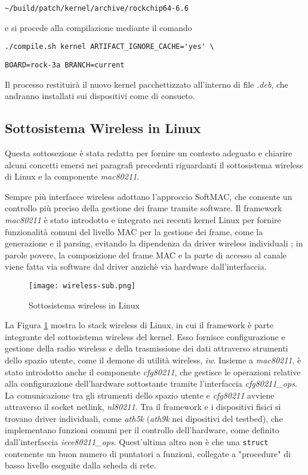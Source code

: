 \verb|~/build/patch/kernel/archive/rockchip64-6.6 |

\noindent e si procede alla compilazione mediante il comando 

\verb|./compile.sh kernel ARTIFACT_IGNORE_CACHE='yes' \| 

\verb|BOARD=rock-3a BRANCH=current|

\noindent Il processo restituirà il nuovo kernel pacchettizzato all'interno di file \textit{.deb}, che andranno installati sui dispositivi come di consueto.

\subsection{Sottosistema Wireless in Linux}
\label{subsystem}
Questa sottosezione è stata redatta per fornire un contesto adeguato e chiarire alcuni concetti emersi nei paragrafi precedenti riguardanti il sottosistema wireless di Linux e la componente \textit{mac80211}.

Sempre più interfacce wireless adottano l'approccio SoftMAC, che consente un controllo più preciso della gestione dei frame tramite software. Il framework \textit{mac80211} è stato introdotto e integrato nei recenti kernel Linux per fornire funzionalità comuni del livello MAC per la gestione dei frame, come la generazione e il parsing, evitando la dipendenza da driver wireless individuali \cite{wireless-profiling}; in parole povere, la composizione del frame MAC e la parte di accesso al canale viene fatta via software dal driver anzichè via hardware dall'interfaccia.

\begin{figure}[h!]
    \centering
    \texttt{[image: wireless-sub.png]}
    \caption{Sottosistema wireless in Linux}
    \label{fig:wireless-sub}
\end{figure}

La Figura \ref{fig:wireless-sub} mostra lo stack wireless di Linux, in cui il framework è parte integrante del sottosistema wireless del kernel. Esso fornisce configurazione e gestione della radio wireless e della trasmissione dei dati attraverso strumenti dello spazio utente, come il demone di utilità wireless, \textit{iw}. Insieme a \textit{mac80211}, è stato introdotto anche il componente \textit{cfg80211}, che gestisce le operazioni relative alla configurazione dell'hardware sottostante tramite l'interfaccia \textit{cfg80211\_ops}. La comunicazione tra gli strumenti dello spazio utente e \textit{cfg80211} avviene attraverso il socket netlink, \textit{nl80211}. Tra il framework e i dispositivi fisici si trovano driver individuali, come \textit{ath5k} (\textit{ath9k} nei dipositivi del testbed), che implementano funzioni comuni per il controllo dell'hardware, come definito dall'interfaccia \textit{ieee80211\_ops}. Quest'ultima altro non è che una \verb|struct| contenente un buon numero di puntatori a funzioni, collegate a "procedure" di basso livello eseguite dalla scheda di rete.

